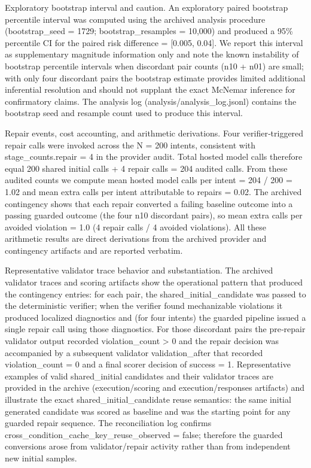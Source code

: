 \documentclass[conference]{IEEEtran}
\begin{document}
Exploratory bootstrap interval and caution. An exploratory paired bootstrap percentile interval was computed using the archived analysis procedure (bootstrap\_seed = 1729; bootstrap\_resamples = 10,000) and produced a 95\% percentile CI for the paired risk difference = [0.005, 0.04]. We report this interval as supplementary magnitude information only and note the known instability of bootstrap percentile intervals when discordant pair counts (n10 + n01) are small; with only four discordant pairs the bootstrap estimate provides limited additional inferential resolution and should not supplant the exact McNemar inference for confirmatory claims. The analysis log (analysis/analysis\_log.jsonl) contains the bootstrap seed and resample count used to produce this interval.

Repair events, cost accounting, and arithmetic derivations. Four verifier‑triggered repair calls were invoked across the N = 200 intents, consistent with stage\_counts.repair = 4 in the provider audit. Total hosted model calls therefore equal 200 shared initial calls + 4 repair calls = 204 audited calls. From these audited counts we compute mean hosted model calls per intent = 204 / 200 = 1.02 and mean extra calls per intent attributable to repairs = 0.02. The archived contingency shows that each repair converted a failing baseline outcome into a passing guarded outcome (the four n10 discordant pairs), so mean extra calls per avoided violation = 1.0 (4 repair calls / 4 avoided violations). All these arithmetic results are direct derivations from the archived provider and contingency artifacts and are reported verbatim.

Representative validator trace behavior and substantiation. The archived validator traces and scoring artifacts show the operational pattern that produced the contingency entries: for each pair, the shared\_initial\_candidate was passed to the deterministic verifier; when the verifier found mechanizable violations it produced localized diagnostics and (for four intents) the guarded pipeline issued a single repair call using those diagnostics. For those discordant pairs the pre‑repair validator output recorded violation\_count > 0 and the repair decision was accompanied by a subsequent validator validation\_after that recorded violation\_count = 0 and a final scorer decision of success = 1. Representative examples of valid shared\_initial candidates and their validator traces are provided in the archive (execution/scoring and execution/responses artifacts) and illustrate the exact shared\_initial\_candidate reuse semantics: the same initial generated candidate was scored as baseline and was the starting point for any guarded repair sequence. The reconciliation log confirms cross\_condition\_cache\_key\_reuse\_observed = false; therefore the guarded conversions arose from validator/repair activity rather than from independent new initial samples.
\end{document}
